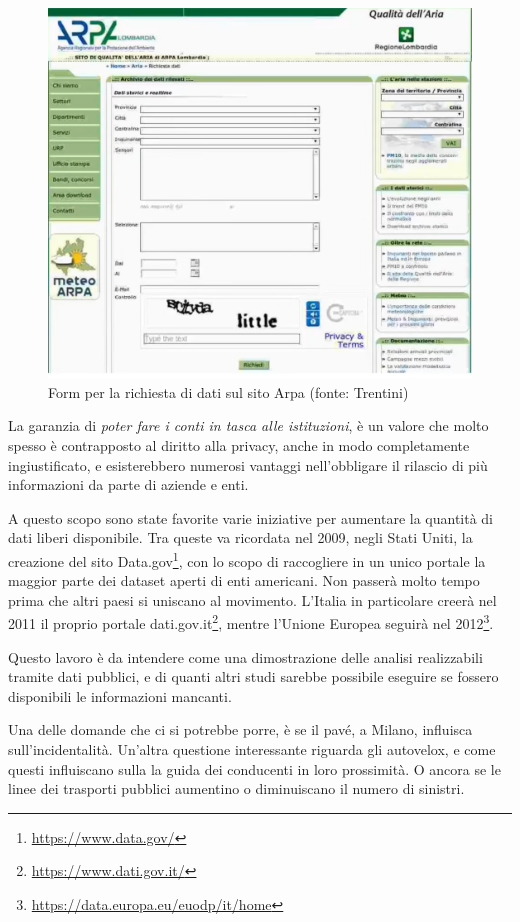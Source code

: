 \documentclass[a4paper,12pt]{report}
\newcommand{\quotestyle}[1]{\textit{#1}}
\newcommand{\skipline}{\vspace{0.2in}}
\begin{document}
\begin{figure}
    \hfill\includegraphics[width=0.7\linewidth]{img/arpa.png}\hspace*{\fill}
    \caption{Form per la richiesta di dati sul sito Arpa (fonte: Trentini)}
    \label{fig:arpa}
\end{figure}

La garanzia di \quotestyle{poter fare i conti in tasca alle istituzioni}, è un 
valore che molto spesso è contrapposto al diritto alla privacy, anche in 
modo completamente ingiustificato, e esisterebbero numerosi vantaggi nell'obbligare 
il rilascio di più informazioni da parte di aziende e enti. 

A questo scopo sono state favorite varie iniziative per aumentare la quantità di 
dati liberi disponibile. 
Tra queste va ricordata nel 2009, negli Stati Uniti, la creazione del sito 
Data.gov\footnote{\url{https://www.data.gov/}}, 
con lo scopo di raccogliere in un unico portale la maggior parte dei dataset 
aperti di enti americani. 
Non passerà molto tempo prima che altri paesi si uniscano al movimento. 
L'Italia in particolare creerà nel 2011 il proprio portale 
dati.gov.it\footnote{\url{https://www.dati.gov.it/}}, mentre l'Unione Europea seguirà 
nel 2012\footnote{\url{https://data.europa.eu/euodp/it/home}}. 

\skipline
Questo lavoro è da intendere come una dimostrazione delle analisi realizzabili 
tramite dati pubblici, e di quanti altri studi sarebbe possibile eseguire se fossero 
disponibili le informazioni mancanti. 

Una delle domande che ci si potrebbe porre, è se il pavé, a Milano, 
influisca sull'incidentalità. 
Un'altra questione interessante riguarda gli autovelox, e come questi influiscano sulla 
la guida dei conducenti in loro prossimità. 
O ancora se le linee dei trasporti pubblici aumentino o diminuiscano il numero di sinistri. 
\end{document}
